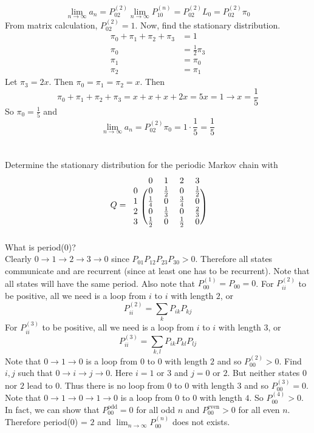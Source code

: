 \documentclass[12pt]{article}
\begin{document}
$$\lim_{n\to\infty} a_n = P_{02}^{(2)}\lim_{n\to\infty} P_{10}^{(n)} = P_{02}^{(2)}L_0 = P_{02}^{(2)}\pi_0$$ From matrix calculation, $P_{02}^{(2)} = 1$. Now, find the stationary distribution. $$ \begin{aligned} \pi_0 + \pi_1 + \pi_2 + \pi_3 &= 1 \\ \pi_0 &= \frac{1}{2}\pi_3 \\ \pi_1 &= \pi_0 \\ \pi_2 &= \pi_1 \end{aligned} $$ Let $\pi_3 = 2x$. Then $\pi_0 = \pi_1 = \pi_2 = x$. Then $$ \pi_0 + \pi_1 + \pi_2 + \pi_3 = x  +x + x + 2x = 5x = 1 \to x = \frac{1}{5}$$ So $\pi_0 = \frac{1}{5}$ and $$\lim_{n\to\infty} a_n = P_{02}^{(2)}\pi_0 = 1 \cdot \frac{1}{5} = \frac{1}{5} $$ \\~\\
Determine the stationary distribution for the periodic Markov chain with $$Q = \begin{blockarray}{ccccc}
&0&1&2&3 \\
\begin{block}{c(cccc)}
0 & 0 & \frac{1}{2} & 0 & \frac{1}{2} \\
1 & \frac{1}{4} & 0 & \frac{3}{4} & 0 \\
2 & 0 & \frac{1}{3} & 0 & \frac{2}{3} \\ 
3 & \frac{1}{2} & 0 & \frac{1}{2} & 0 \\   \end{block} \end{blockarray} $$
What is period($0$)? \\ 
Clearly $0\to1\to2\to3\to0$ since $P_{01}P_{12}P_{23}P_{30} > 0$. Therefore all states communicate and are recurrent (since at least one has to be recurrent). Note that all states will have the same period. Also note that $P_{00}^{(1)} = P_{00} = 0$. For $P_{ii}^{(2)}$ to be positive, all we need is a loop from $i$ to $i$ with length $2$, or $$P_{ii}^{(2)} = \sum_k P_{ik}P_{kj} $$ For $P_{ii}^{(3)}$ to be positive, all we need is a loop from $i$ to $i$ with length $3$, or $$P_{ii}^{(3)} = \sum_{k,l} P_{ik}P_{kl}P_{lj} $$ Note that $0 \to 1 \to 0$ is a loop from $0$ to $0$ with length $2$ and so $P_{00}^{(2)} > 0$. Find $i,j$ such that $0 \to i \to j \to 0$. Here $i = 1$ or $3$ and $j = 0$ or $2$. But neither states $0$ nor $2$ lead to $0$. Thus there is no loop from $0$ to $0$ with length $3$ and so $P_{00}^{(3)} = 0$. Note that $0\to1\to0\to1\to0$ is a loop from $0$ to $0$ with length $4$. So $P_{00}^{(4)} > 0$. In fact, we can show that $P_{00}^{\text{odd}} = 0$ for all odd $n$ and $P_{00}^{\text{even}} > 0$ for all even $n$. Therefore period($0$) = $2$ and $\lim_{n\to\infty} P_{00}^{(n)}$ does not exists. 
\end{document}
